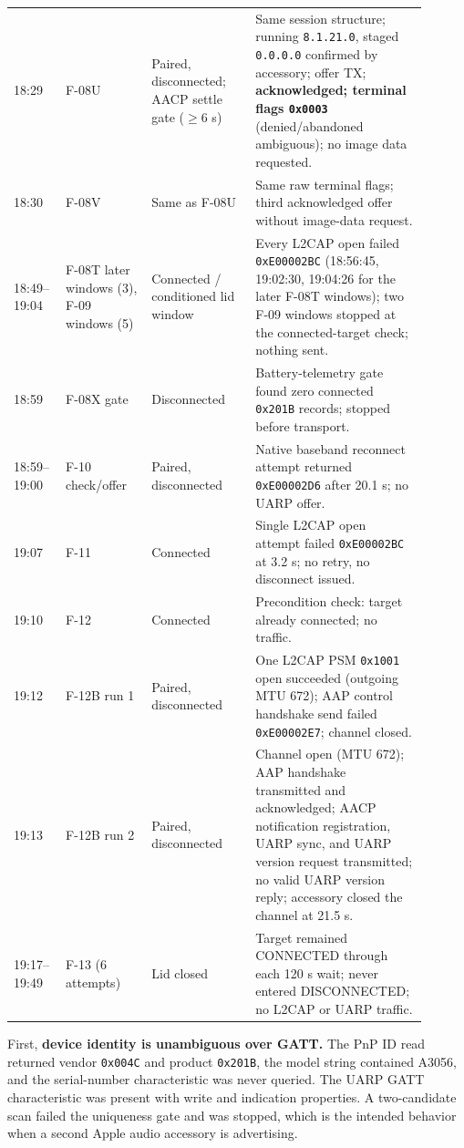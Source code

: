 \documentclass[11pt,letterpaper]{article}
\begin{document}
\begin{center}
\begin{longtable}{@{}p{0.10\linewidth}p{0.19\linewidth}p{0.23\linewidth}p{0.38\linewidth}@{}}
18:29 & F-08U & Paired, disconnected; AACP settle gate ($\geq$6 s) & Same session structure; running \texttt{8.1.21.0}, staged \texttt{0.0.0.0} confirmed by accessory; offer TX; \textbf{acknowledged; terminal flags \texttt{0x0003}} (denied/abandoned ambiguous); no image data requested. \\
18:30 & F-08V & Same as F-08U & Same raw terminal flags; third acknowledged offer without image-data request. \\
18:49--19:04 & F-08T later windows (3), F-09 windows (5) & Connected / conditioned lid window & Every L2CAP open failed \texttt{0xE00002BC} (18:56:45, 19:02:30, 19:04:26 for the later F-08T windows); two F-09 windows stopped at the connected-target check; nothing sent. \\
18:59 & F-08X gate & Disconnected & Battery-telemetry gate found zero connected \texttt{0x201B} records; stopped before transport. \\
18:59--19:00 & F-10 check/offer & Paired, disconnected & Native baseband reconnect attempt returned \texttt{0xE00002D6} after 20.1 s; no UARP offer. \\
19:07 & F-11 & Connected & Single L2CAP open attempt failed \texttt{0xE00002BC} at 3.2 s; no retry, no disconnect issued. \\
19:10 & F-12 & Connected & Precondition check: target already connected; no traffic. \\
19:12 & F-12B run 1 & Paired, disconnected & One L2CAP PSM \texttt{0x1001} open succeeded (outgoing MTU 672); AAP control handshake send failed \texttt{0xE00002E7}; channel closed. \\
19:13 & F-12B run 2 & Paired, disconnected & Channel open (MTU 672); AAP handshake transmitted and acknowledged; AACP notification registration, UARP sync, and UARP version request transmitted; no valid UARP version reply; accessory closed the channel at 21.5 s. \\
19:17--19:49 & F-13 (6 attempts) & Lid closed & Target remained CONNECTED through each 120 s wait; never entered DISCONNECTED; no L2CAP or UARP traffic. \\
\end{longtable}
\end{center}

First, \textbf{device identity is unambiguous over GATT.} The PnP ID read returned vendor \texttt{0x004C} and product \texttt{0x201B}, the model string contained A3056, and the serial-number characteristic was never queried. The UARP GATT characteristic was present with write and indication properties. A two-candidate scan failed the uniqueness gate and was stopped, which is the intended behavior when a second Apple audio accessory is advertising.
\end{document}
